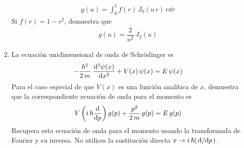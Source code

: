 \documentclass[12pt]{article}
\numberwithin{equation}{section}
\begin{document}
\begin{enumerate}
\begin{align*}
g(u) = \int_{0}^{1} f(r) \, J_{0} (u \, r) \, r \dd{r}
\end{align*}
Si $f(r) = 1 - r^{2}$, demuestra que
\begin{align*}
g(u) = \dfrac{2}{u^{2}} \, J_{2}(u)
\end{align*}
\item La ecuación unidimensional de onda de Schrödinger es
\begin{align*}
- \dfrac{\hbar^{2}}{2 \, m} \; \dv[2]{\psi(x)}{x} +  V(x) \, \psi(x) = E \, \psi (x)
\end{align*}
Para el caso especial de que $V(x)$ es una función analítica de $x$, demuestra que la correspondiente ecuación de onda para el momento es
\begin{align*}
V \left( i \, \hbar \dv{p} \right) g(p) + \dfrac{p^{2}}{2 \, m} \, g(p) =  E \, g(p)
\end{align*}
Recupera esta ecuación de onda para el momento usando la transformada de Fourier y su inversa. No utilices la sustitución directa $\displaystyle{x \to i \, \hbar (\dv*{p})}$.
\end{enumerate}
\end{document}
